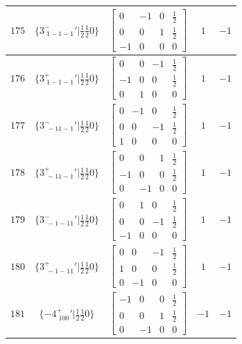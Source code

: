 \documentclass[fleqn,8pt]{jsarticle}
\begin{document}
\begin{longtable}{ccccc}
$ 175 $ & $ \{3^{-}_{\,\,1-1-1}{}'|\frac{1}{2} \frac{1}{2} 0\} $ & $ \begin{bmatrix} 0 & -1 & 0 & \frac{1}{2} \\ 0 & 0 & 1 & \frac{1}{2} \\ -1 & 0 & 0 & 0 \end{bmatrix} $ & $ 1 $ & $ -1 $ \\ \hline
$ 176 $ & $ \{3^{+}_{\,\,1-1-1}{}'|\frac{1}{2} \frac{1}{2} 0\} $ & $ \begin{bmatrix} 0 & 0 & -1 & \frac{1}{2} \\ -1 & 0 & 0 & \frac{1}{2} \\ 0 & 1 & 0 & 0 \end{bmatrix} $ & $ 1 $ & $ -1 $ \\ \hline
$ 177 $ & $ \{3^{-}_{\,\,-11-1}{}'|\frac{1}{2} \frac{1}{2} 0\} $ & $ \begin{bmatrix} 0 & -1 & 0 & \frac{1}{2} \\ 0 & 0 & -1 & \frac{1}{2} \\ 1 & 0 & 0 & 0 \end{bmatrix} $ & $ 1 $ & $ -1 $ \\ \hline
$ 178 $ & $ \{3^{+}_{\,\,-11-1}{}'|\frac{1}{2} \frac{1}{2} 0\} $ & $ \begin{bmatrix} 0 & 0 & 1 & \frac{1}{2} \\ -1 & 0 & 0 & \frac{1}{2} \\ 0 & -1 & 0 & 0 \end{bmatrix} $ & $ 1 $ & $ -1 $ \\ \hline
$ 179 $ & $ \{3^{-}_{\,\,-1-11}{}'|\frac{1}{2} \frac{1}{2} 0\} $ & $ \begin{bmatrix} 0 & 1 & 0 & \frac{1}{2} \\ 0 & 0 & -1 & \frac{1}{2} \\ -1 & 0 & 0 & 0 \end{bmatrix} $ & $ 1 $ & $ -1 $ \\ \hline
$ 180 $ & $ \{3^{+}_{\,\,-1-11}{}'|\frac{1}{2} \frac{1}{2} 0\} $ & $ \begin{bmatrix} 0 & 0 & -1 & \frac{1}{2} \\ 1 & 0 & 0 & \frac{1}{2} \\ 0 & -1 & 0 & 0 \end{bmatrix} $ & $ 1 $ & $ -1 $ \\ \hline
$ 181 $ & $ \{-4^{+}_{\,\,100}{}'|\frac{1}{2} \frac{1}{2} 0\} $ & $ \begin{bmatrix} -1 & 0 & 0 & \frac{1}{2} \\ 0 & 0 & 1 & \frac{1}{2} \\ 0 & -1 & 0 & 0 \end{bmatrix} $ & $ -1 $ & $ -1 $ \\ \hline

\end{longtable}
\end{document}
